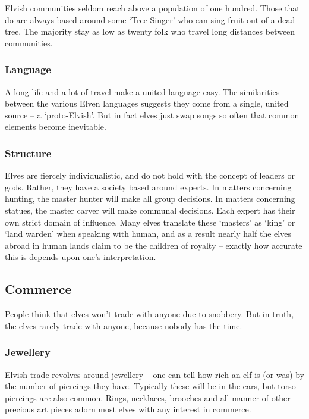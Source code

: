 \begin{multicols}{2}
Elvish communities seldom reach above a population of one hundred.
Those that do are always based around some `Tree Singer' who can sing fruit out of a dead tree.
The majority stay as low as twenty folk who travel long distances between communities.

\subsubsection{Language}

A long life and a lot of travel make a united language easy.
The similarities between the various Elven languages suggests they come from a single, united source -- a `proto-Elvish'.
But in fact elves just swap songs so often that common elements become inevitable.

\subsubsection{Structure}

Elves are fiercely individualistic, and do not hold with the concept of leaders or gods.
Rather, they have a society based around experts.
In matters concerning hunting, the master hunter will make all group decisions.
In matters concerning statues, the master carver will make communal decisions.
Each expert has their own strict domain of influence.
Many elves translate these `masters' as `king' or `land warden' when speaking with human, and as a result nearly half the elves abroad in human lands claim to be the children of royalty -- exactly how accurate this is depends upon one's interpretation.

\subsection{Commerce}

People think that elves won't trade with anyone due to snobbery.
But in truth, the elves rarely trade with anyone, because nobody has the time.

\subsubsection{Jewellery}

Elvish trade revolves around jewellery -- one can tell how rich an elf is (or was) by the number of piercings they have.
Typically these will be in the ears, but torso piercings are also common.
Rings, necklaces, brooches and all manner of other precious art pieces adorn most elves with any interest in commerce.


\end{multicols}
